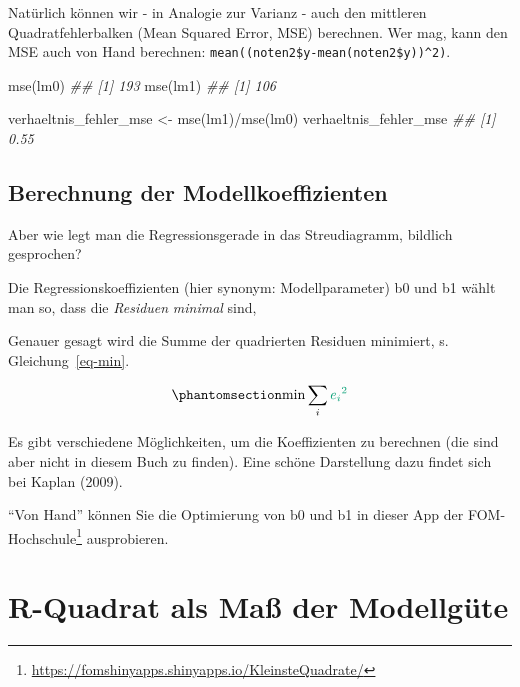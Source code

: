 \documentclass[
  a4paper,
]{scrbook}
\newenvironment{Shaded}{\begin{snugshade}}{\end{snugshade}}
\newcommand{\DocumentationTok}[1]{\textcolor[rgb]{0.37,0.37,0.37}{\textit{#1}}}
\newcommand{\FunctionTok}[1]{\textcolor[rgb]{0.28,0.35,0.67}{#1}}
\newcommand{\NormalTok}[1]{\textcolor[rgb]{0.00,0.23,0.31}{#1}}
\newcommand{\OtherTok}[1]{\textcolor[rgb]{0.00,0.23,0.31}{#1}}
\newcommand{\SpecialCharTok}[1]{\textcolor[rgb]{0.37,0.37,0.37}{#1}}
\theoremstyle{definition}
\theoremstyle{definition}
\theoremstyle{definition}
\theoremstyle{remark}
\begin{document}
Natürlich können wir - in Analogie zur Varianz - auch den mittleren
Quadratfehlerbalken (Mean Squared Error, MSE) berechnen. Wer mag, kann
den MSE auch von Hand berechnen:
\texttt{mean((noten2\$y-mean(noten2\$y))\^{}2)}.

\begin{Shaded}
\begin{Highlighting}[]
\FunctionTok{mse}\NormalTok{(lm0)}
\DocumentationTok{\#\# [1] 193}
\FunctionTok{mse}\NormalTok{(lm1)}
\DocumentationTok{\#\# [1] 106}
\end{Highlighting}
\end{Shaded}

\begin{Shaded}
\begin{Highlighting}[]
\NormalTok{verhaeltnis\_fehler\_mse }\OtherTok{\textless{}{-}} \FunctionTok{mse}\NormalTok{(lm1)}\SpecialCharTok{/}\FunctionTok{mse}\NormalTok{(lm0)}
\NormalTok{verhaeltnis\_fehler\_mse}
\DocumentationTok{\#\# [1] 0.55}
\end{Highlighting}
\end{Shaded}

\subsection{Berechnung der
Modellkoeffizienten}\label{berechnung-der-modellkoeffizienten}

Aber wie legt man die Regressionsgerade in das Streudiagramm, bildlich
gesprochen?

Die Regressionskoeffizienten (hier synonym: Modellparameter) b0 und b1
wählt man so, dass die \emph{Residuen} \emph{minimal} sind,

Genauer gesagt wird die Summe der quadrierten {Residuen} minimiert, s.
Gleichung~\ref{eq-min}.

\begin{equation}\phantomsection\label{eq-min}{\text{min}\sum_i \color{errorcol}{e_i}^2}\end{equation}

Es gibt verschiedene Möglichkeiten, um die Koeffizienten zu berechnen
(die sind aber nicht in diesem Buch zu finden). Eine schöne Darstellung
dazu findet sich bei Kaplan (2009).

``Von Hand'' können Sie die Optimierung von b0 und b1 in dieser App der
FOM-Hochschule\footnote{\url{https://fomshinyapps.shinyapps.io/KleinsteQuadrate/}}
ausprobieren.

\section{R-Quadrat als Maß der
Modellgüte}\label{r-quadrat-als-mauxdf-der-modellguxfcte}
\end{document}
